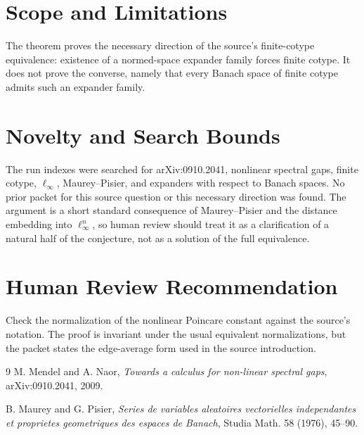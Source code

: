 \documentclass[11pt]{article}
\begin{document}
\section*{Scope and Limitations}

The theorem proves the necessary direction of the source's finite-cotype
equivalence: existence of a normed-space expander family forces finite cotype.
It does not prove the converse, namely that every Banach space of finite cotype
admits such an expander family.

\section*{Novelty and Search Bounds}

The run indexes were searched for arXiv:0910.2041, nonlinear spectral gaps,
finite cotype, \(\ell_\infty\), Maurey--Pisier, and expanders with respect to
Banach spaces. No prior packet for this source question or this necessary
direction was found. The argument is a short standard consequence of
Maurey--Pisier and the distance embedding into \(\ell_\infty^n\), so human
review should treat it as a clarification of a natural half of the conjecture,
not as a solution of the full equivalence.

\section*{Human Review Recommendation}

Check the normalization of the nonlinear Poincare constant against the source's
notation. The proof is invariant under the usual equivalent normalizations, but
the packet states the edge-average form used in the source introduction.

\begin{thebibliography}{9}
M. Mendel and A. Naor,
\emph{Towards a calculus for non-linear spectral gaps}, arXiv:0910.2041, 2009.

B. Maurey and G. Pisier,
\emph{Series de variables aleatoires vectorielles independantes et proprietes
geometriques des espaces de Banach}, Studia Math. 58 (1976), 45--90.
\end{thebibliography}
\end{document}
